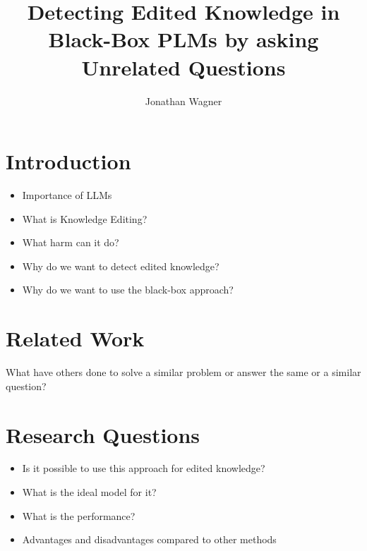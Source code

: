 \documentclass[sigplan, nonacm]{acmart}
\title{Detecting Edited Knowledge in Black-Box PLMs by asking Unrelated Questions}
\author{Jonathan Wagner}
\begin{document}
    \maketitle
    
    \section{Introduction}
   	\begin{itemize}
    		\item Importance of LLMs
    		\item What is Knowledge Editing? \cite{youssef_detecting_2024}
		\item What harm can it do?
    		\item Why do we want to detect edited knowledge?
    		\item Why do we want to use the black-box approach?
    	\end{itemize}
        
    \section{Related Work}
    	What have others done to solve a similar problem or answer the same or a similar
    	question?    
    \section{Research Questions}
   	\begin{itemize}
		\item Is it possible to use this approach for edited knowledge?
		\item What is the ideal model for it?
		\item What is the performance?
		\item Advantages and disadvantages compared to other methods
	\end{itemize}
    
\end{document}
